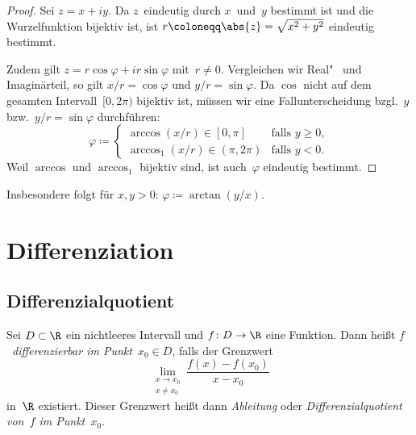 \documentclass[a4paper]{article}
\begin{document}
\begin{proof}
    Sei $z = x+iy$. Da $z$~eindeutig durch $x$~und~$y$ bestimmt ist und die Wurzelfunktion bijektiv ist, ist $r \coloneqq \abs{z} = \sqrt{x^2+y^2}$ eindeutig bestimmt.

    Zudem gilt $z = r\cos\varphi + ir\sin\varphi$ mit~$r \neq 0$. Vergleichen wir Real"~ und Imaginärteil, so gilt $x/r = \cos\varphi$ und $y/r = \sin\varphi$. Da $\cos$ nicht auf dem gesamten Intervall~$[0, 2\pi)$ bijektiv ist, müssen wir eine Fallunterscheidung bzgl.\ $y$ bzw.\ $y/r = \sin\varphi$ durchführen:
    \begin{equation*}
        \varphi \coloneqq \begin{cases}
            \arccos(x/r) \in [0,\pi]       & \text{falls } y \geq 0, \\
            \arccos_1(x/r) \in (\pi, 2\pi) & \text{falls } y < 0.
        \end{cases}
    \end{equation*}
    Weil $\arccos$ und $\arccos_1$ bijektiv sind, ist auch~$\varphi$ eindeutig bestimmt.
\end{proof}

\begin{remark}
    Insbesondere folgt für $x,y > 0$: $\varphi \coloneqq \arctan(y/x)$.
\end{remark}

\section{Differenziation}

\subsection{Differenzialquotient}

\begin{definition}
    Sei $D \subset \R$ ein nichtleeres Intervall und $f\colon D \to \R$ eine Funktion. Dann heißt $f$~\emph{differenzierbar im Punkt~$x_0 \in D$}, falls der Grenzwert
    \begin{equation*}
        \lim_{\substack{x\to x_0\\x \neq x_0}} \frac{f(x)-f(x_0)}{x-x_0}
    \end{equation*}
    in~$\R$ existiert. Dieser Grenzwert heißt dann \emph{Ableitung} oder \emph{Differenzialquotient von~$f$ im Punkt~$x_0$}.
\end{definition}
\end{document}
